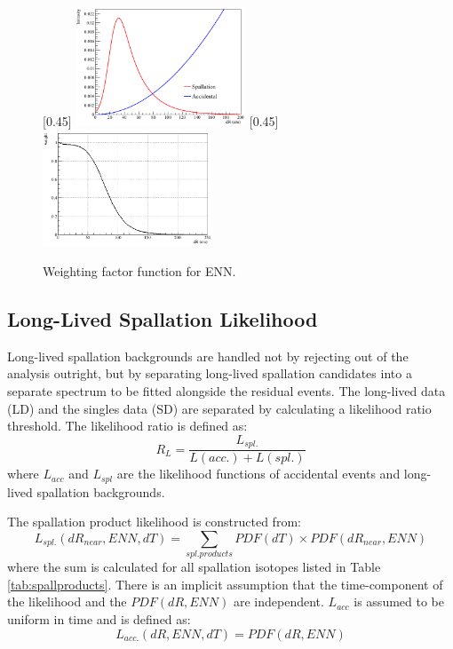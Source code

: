 \begin{figure}[htbp]
	\centering
	[0.45\textwidth]{
		\includegraphics[width=0.45\textwidth]{spall_dR.png}}
	\hfill
	[0.45\textwidth]{
		\includegraphics[width=0.45\textwidth]{ENN_dR.png}}
	\caption{Weighting factor function for ENN.}
	\label{fig:ENN_dR}
\end{figure}

\subsection*{Long-Lived Spallation Likelihood}
Long-lived spallation backgrounds are handled not by rejecting out of the analysis outright, but by separating long-lived spallation candidates into a separate spectrum to be fitted alongside the residual events. The long-lived data (LD) and the singles data (SD) are separated by calculating a likelihood ratio threshold. The likelihood ratio is defined as:
\begin{equation}
	R_L=\frac{L_{spl.}}{L(acc.)+L(spl.)}
\end{equation}
where $L_{acc}$ and $L_{spl}$ are the likelihood functions of accidental events and long-lived spallation backgrounds.

The spallation product likelihood is constructed from:
\begin{equation}
	L_{spl.}(dR_{near}, ENN, dT)=\sum_{spl. products}PDF(dT)\times PDF(dR_{near}, ENN)
\end{equation}
where the sum is calculated for all spallation isotopes listed in Table \ref{tab:spallproducts}. There is an implicit assumption that the time-component of the likelihood and the $PDF(dR, ENN)$ are independent. $L_{acc}$ is assumed to be uniform in time and is defined as:
\begin{equation}
	L_{acc.}(dR, ENN, dT) = PDF(dR, ENN)
\end{equation}

